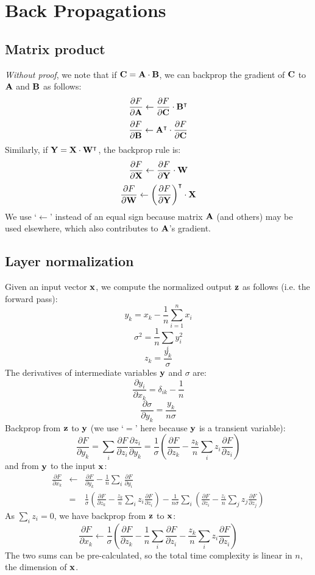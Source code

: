 \documentclass[10pt]{article}
\begin{document}
\section{Back Propagations}

\subsection{Matrix product}

\emph{Without proof}, we note that if ${\bf C}={\bf A}\cdot{\bf B}$, we can backprop
the gradient of ${\bf C}$ to ${\bf A}$ and ${\bf B}$ as follows:
\[
\frac{\partial F}{\partial {\bf A}}\gets\frac{\partial F}{\partial {\bf C}}\cdot {\bf B}^\intercal
\]
\[
\frac{\partial F}{\partial {\bf B}}\gets{\bf A}^\intercal\cdot\frac{\partial F}{\partial {\bf C}}
\]
Similarly, if ${\bf Y}={\bf X}\cdot{\bf W}^\intercal$, the backprop rule is:
\[
\frac{\partial F}{\partial {\bf X}}\gets\frac{\partial F}{\partial {\bf Y}}\cdot {\bf W}
\]
\[
\frac{\partial F}{\partial {\bf W}}\gets\left(\frac{\partial F}{\partial {\bf Y}}\right)^\intercal\cdot{\bf X}
\]
We use `$\gets$' instead of an equal sign because matrix ${\bf A}$ (and others)
may be used elsewhere, which also contributes to ${\bf A}$'s gradient.

\subsection{Layer normalization}

Given an input vector ${\bf x}$, we compute the normalized output ${\bf z}$ as
follows (i.e. the forward pass):
\[
y_k = x_k - \frac{1}{n}\sum_{i=1}^n x_i
\]
\[
\sigma^2 = \frac{1}{n}\sum_i y_i^2
\]
\[
z_k = \frac{y_k}{\sigma}
\]
The derivatives of intermediate variables ${\bf y}$ and $\sigma$ are:
\[
\frac{\partial y_i}{\partial x_k} = \delta_{ik}-\frac{1}{n}
\]
\[
\frac{\partial\sigma}{\partial y_k} = \frac{y_k}{n\sigma}
\]
Backprop from ${\bf z}$ to ${\bf y}$ (we use `$=$' here because ${\bf y}$ is a transient variable):
\[
\frac{\partial F}{\partial y_k}=\sum_i\frac{\partial F}{\partial z_i}\frac{\partial z_i}{\partial y_k}
=\frac{1}{\sigma}\left(\frac{\partial F}{\partial z_k}-\frac{z_k}{n}\sum_iz_i\frac{\partial F}{\partial z_i}\right)
\]
and from ${\bf y}$ to the input ${\bf x}$:
\begin{eqnarray*}
\frac{\partial F}{\partial x_k}&\gets&\frac{\partial F}{\partial y_k} - \frac{1}{n}\sum_i\frac{\partial F}{\partial y_i}\\
&=&\frac{1}{\sigma}\left(\frac{\partial F}{\partial z_k}-\frac{z_k}{n}\sum_iz_i\frac{\partial F}{\partial z_i}\right)
-\frac{1}{n\sigma}\sum_i\left(\frac{\partial F}{\partial z_i}-\frac{z_i}{n}\sum_jz_j\frac{\partial F}{\partial z_j}\right)
\end{eqnarray*}
As $\sum_i z_i=0$, we have backprop from ${\bf z}$ to ${\bf x}$:
\[
\frac{\partial F}{\partial x_k}
\gets\frac{1}{\sigma}\left(\frac{\partial F}{\partial z_k}-\frac{1}{n}\sum_i\frac{\partial F}{\partial z_i}-\frac{z_k}{n}\sum_iz_i\frac{\partial F}{\partial z_i}\right)
\]
The two sums can be pre-calculated, so the total time complexity is linear in
$n$, the dimension of ${\bf x}$.
\end{document}
